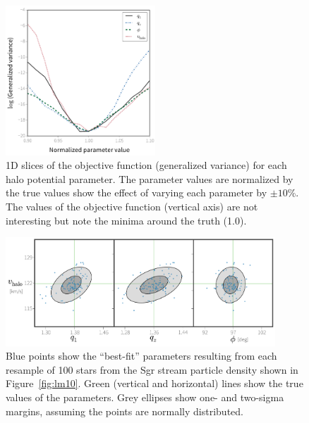 \begin{figure}[t]
\begin{center}
\includegraphics[width=0.5\textwidth]{figures/ch1/fig4.pdf}
\caption{ 1D slices of the objective function (generalized variance) for each
halo potential parameter. The parameter values are normalized by the true values
show the effect of varying each parameter by $\pm10$\%. The values of the
objective function (vertical axis) are not interesting but note the minima
around the truth (1.0).}\label{fig:objective}
\end{center}
\end{figure}

\begin{figure}[t]
\centering\includegraphics[width=0.9\textwidth,trim=0 0 0 0, clip]{figures/ch1/fig5.pdf}
\caption{ Blue points show the ``best-fit'' parameters resulting from each
resample of 100 stars from the Sgr stream particle density shown in
Figure~\ref{fig:lm10}. Green (vertical and horizontal) lines show the true
values of the parameters. Grey ellipses show one- and two-sigma margins,
assuming the points are normally distributed. }\label{fig:bootstrap}
\end{figure}

